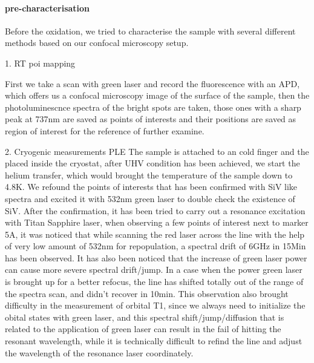 \paragraph{pre-characterisation}
Before the oxidation, we tried to characterise the sample with several different methods based on our confocal microscopy setup.

1. RT poi mapping

First we take a scan with green laser and record the fluorescence with an APD, which offers us a confocal microscopy image of the surface of the sample, then the photoluminescnce spectra of the bright spots are taken, those ones with a sharp peak at 737nm are saved as points of interests and their positions are saved as region of interest for the reference of further examine.


2. Cryogenic measurements PLE 
The sample is attached to an cold finger and the placed inside the cryostat, after UHV condition has been achieved, we start the helium transfer, which would brought the temperature of the sample down to 4.8K. We refound the points of interests that has been confirmed with SiV like spectra and excited it with 532nm green laser to double check the existence of SiV. After the confirmation, it has been tried to carry out a resonance excitation with Titan Sapphire laser, when observing a few points of interest next to marker 5A, it was noticed that while scanning the red laser across the line with the help of very low amount of 532nm for repopulation, a spectral drift of 6GHz in 15Min has been observed. It has also been noticed that the increase of green laser power can cause more severe spectral drift/jump. In a case when the power green laser is brought up for a better refocus, the line has shifted totally out of the range of the spectra scan, and didn't recover in 10min. This observation also brought difficulty in the measurement of orbital T1, since we always need to initialize the obital states with green laser, and this spectral shift/jump/diffusion that is related to the application of green laser can result in the fail of hitting the resonant wavelength, while it is technically difficult to refind the line and adjust the wavelength of the resonance laser coordinately. 

